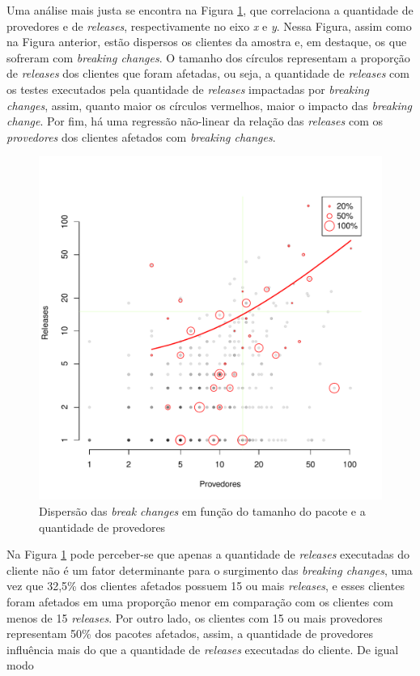 Uma análise mais justa se encontra na Figura \ref{fig:result_rq1_releases_affecteds}, que correlaciona a quantidade de provedores e de \textit{releases}, respectivamente no eixo \textit{x} e \textit{y}. Nessa Figura, assim como na Figura anterior, estão dispersos os clientes da amostra e, em destaque, os que sofreram com \textit{breaking changes}. O tamanho dos círculos  representam a proporção de \textit{releases} dos clientes que foram afetadas, ou seja, a quantidade de \textit{releases} com os testes executados pela quantidade de \textit{releases} impactadas por \textit{breaking changes}, assim, quanto maior os círculos vermelhos, maior o impacto das \textit{breaking change}. Por fim, há uma regressão não-linear da relação das \textit{releases} com os \textit{provedores} dos clientes afetados com \textit{breaking changes}.

\begin{figure}
    \centering
    \includegraphics[scale=0.6]{figuras/result_rq1_releases_affecteds.pdf}
    \caption{Dispersão das \textit{break changes} em função do tamanho do pacote e a quantidade de provedores}
    \label{fig:result_rq1_releases_affecteds}
\end{figure}{}

Na Figura \ref{fig:result_rq1_releases_affecteds} pode perceber-se que apenas a quantidade de \textit{releases} executadas do cliente não é um fator determinante para o surgimento das \textit{breaking changes}, uma vez que 32,5\% dos clientes afetados possuem 15 ou mais \textit{releases}, e esses clientes foram afetados em uma proporção menor em comparação com os clientes com menos de 15 \textit{releases}. Por outro lado, os clientes com 15 ou mais provedores representam 50\% dos pacotes afetados, assim, a quantidade de provedores influência mais do que a quantidade de \textit{releases} executadas do cliente. De igual modo






